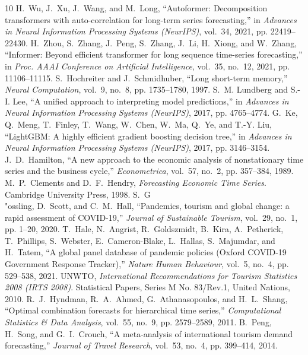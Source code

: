 \documentclass[10pt,journal,compsoc]{IEEEtran}
\begin{document}
\begin{thebibliography}{10}
H.~Wu, J.~Xu, J.~Wang, and M.~Long, ``Autoformer: Decomposition transformers with auto-correlation for long-term series forecasting,'' in \emph{Advances in Neural Information Processing Systems (NeurIPS)}, vol.~34, 2021, pp. 22419--22430.
H.~Zhou, S.~Zhang, J.~Peng, S.~Zhang, J.~Li, H.~Xiong, and W.~Zhang, ``Informer: Beyond efficient transformer for long sequence time-series forecasting,'' in \emph{Proc. AAAI Conference on Artificial Intelligence}, vol.~35, no.~12, 2021, pp. 11106--11115.
S.~Hochreiter and J.~Schmidhuber, ``Long short-term memory,'' \emph{Neural Computation}, vol.~9, no.~8, pp. 1735--1780, 1997.
S.~M. Lundberg and S.-I. Lee, ``A unified approach to interpreting model predictions,'' in \emph{Advances in Neural Information Processing Systems (NeurIPS)}, 2017, pp. 4765--4774.
G.~Ke, Q.~Meng, T.~Finley, T.~Wang, W.~Chen, W.~Ma, Q.~Ye, and T.-Y. Liu, ``LightGBM: A highly efficient gradient boosting decision tree,'' in \emph{Advances in Neural Information Processing Systems (NeurIPS)}, 2017, pp. 3146--3154.
J.~D.~Hamilton, ``A new approach to the economic analysis of nonstationary time series and the business cycle,'' \emph{Econometrica}, vol.~57, no.~2, pp. 357--384, 1989.
M.~P.~Clements and D.~F.~Hendry, \emph{Forecasting Economic Time Series}. Cambridge University Press, 1998.
S.~G{\\"o}ssling, D.~Scott, and C.~M.~Hall, ``Pandemics, tourism and global change: a rapid assessment of COVID-19,'' \emph{Journal of Sustainable Tourism}, vol.~29, no.~1, pp. 1--20, 2020.
T.~Hale, N.~Angrist, R.~Goldszmidt, B.~Kira, A.~Petherick, T.~Phillips, S.~Webster, E.~Cameron-Blake, L.~Hallas, S.~Majumdar, and H.~Tatem, ``A global panel database of pandemic policies (Oxford COVID-19 Government Response Tracker),'' \emph{Nature Human Behaviour}, vol.~5, no.~4, pp. 529--538, 2021.
UNWTO, \emph{International Recommendations for Tourism Statistics 2008 (IRTS 2008)}. Statistical Papers, Series M No. 83/Rev.1, United Nations, 2010.
R.~J.~Hyndman, R.~A.~Ahmed, G.~Athanasopoulos, and H.~L.~Shang, ``Optimal combination forecasts for hierarchical time series,'' \emph{Computational Statistics \& Data Analysis}, vol.~55, no.~9, pp. 2579--2589, 2011.
B.~Peng, H.~Song, and G.~I.~Crouch, ``A meta-analysis of international tourism demand forecasting,'' \emph{Journal of Travel Research}, vol.~53, no.~4, pp. 399--414, 2014.
\end{thebibliography}
\end{document}
